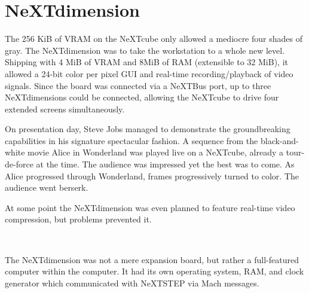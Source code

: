 \section{NeXTdimension}
\vspace{-3pt}
The 256 KiB of VRAM on the NeXTcube only allowed a mediocre four shades of gray. The NeXTdimension was to take the workstation to a whole new level. Shipping with 4 MiB of VRAM and 8MiB of RAM (extensible to 32 MiB), it allowed a 24-bit color per pixel GUI and real-time recording/playback of video signals. Since the board was connected via a NeXTBus port, up to three NeXTdimensions could be connected, allowing the NeXTcube to drive four extended screens simultaneously.\\
\vspace{-2pt}
\par
On presentation day, Steve Jobs managed to demonstrate the groundbreaking capabilities in his signature spectacular fashion. A sequence from the black-and-white movie Alice in Wonderland was played live on a NeXTcube, already a tour-de-force at the time. The audience was impressed yet the best was to come. As Alice progressed through Wonderland, frames progressively turned to color. The audience went berserk.\\
\par
At some point the NeXTdimension was even planned to feature real-time video compression, but problems prevented it.\\
\par
{}\\
\par
\vspace{-2pt}
The NeXTdimension was not a mere expansion board, but rather a full-featured computer within the computer. It had its own operating system, RAM, and clock generator which communicated with NeXTSTEP via Mach messages.\\
\par
{}\\
